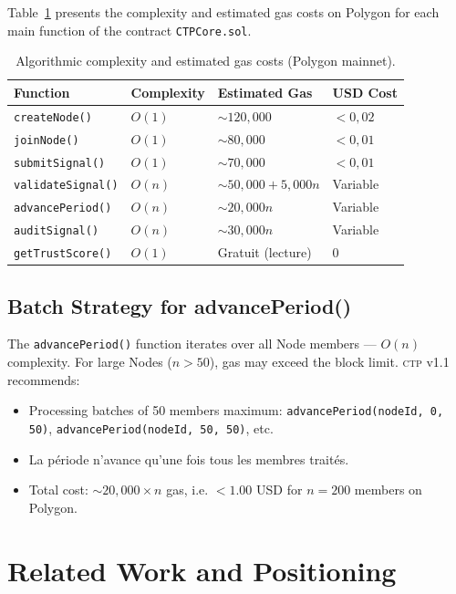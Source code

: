 \documentclass[12pt,a4paper]{article}
\theoremstyle{definition}
\theoremstyle{plain}
\theoremstyle{remark}
\newcommand{\CTP}{\textsc{ctp}}
\newcommand{\1}{\mathbf{1}}
\begin{document}
Table~\ref{tab:complexity} presents the complexity and estimated gas costs
on Polygon for each main function of the contract
\texttt{CTPCore.sol}.

\begin{table}[h]
\centering
\caption{Algorithmic complexity and estimated gas costs (Polygon mainnet).}
\label{tab:complexity}
\begin{tabular}{llll}
\toprule
\textbf{Function} & \textbf{Complexity} & \textbf{Estimated Gas} & \textbf{USD Cost} \\
\midrule
\texttt{createNode()}      & $O(1)$    & $\sim 120{,}000$     & $< 0{,}02$ \\
\texttt{joinNode()}        & $O(1)$    & $\sim 80{,}000$      & $< 0{,}01$ \\
\texttt{submitSignal()}    & $O(1)$    & $\sim 70{,}000$      & $< 0{,}01$ \\
\texttt{validateSignal()}  & $O(n)$    & $\sim 50{,}000 + 5{,}000n$ & Variable \\
\texttt{advancePeriod()}   & $O(n)$    & $\sim 20{,}000n$     & Variable \\
\texttt{auditSignal()}     & $O(n)$    & $\sim 30{,}000n$     & Variable \\
\texttt{getTrustScore()}   & $O(1)$    & Gratuit (lecture)    & $0$ \\
\bottomrule
\end{tabular}
\end{table}

\subsection{Batch Strategy for advancePeriod()}

The \texttt{advancePeriod()} function iterates over all Node members
--- $O(n)$ complexity. For large Nodes ($n > 50$),
gas may exceed the block limit. \CTP{} v1.1 recommends:

\begin{itemize}
  \item Processing batches of 50 members maximum:
    \texttt{advancePeriod(nodeId, 0, 50)}, \texttt{advancePeriod(nodeId, 50, 50)}, etc.
  \item La période n'avance qu'une fois tous les membres traités.
  \item Total cost: $\sim 20{,}000 \times n$ gas, i.e. $< 1.00$ USD
    for $n = 200$ members on Polygon.
\end{itemize}

\section{Related Work and Positioning}
\label{sec:related}
\end{document}
